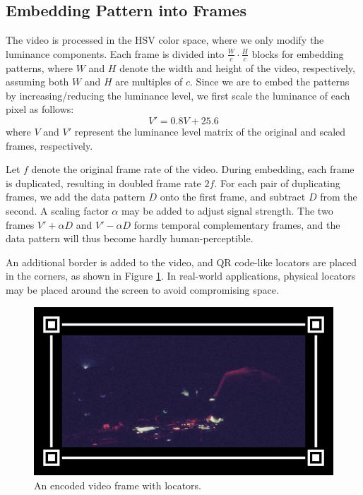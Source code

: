 \documentclass{acm_proc_article-sp}
\begin{document}
\subsection{Embedding Pattern into Frames}
The video is processed in the HSV color space, where we only modify the luminance components. Each frame is divided into $\frac{W}{c}\cdot\frac{H}{c}$ blocks for embedding patterns, where $W$ and $H$ denote the width and height of the video, respectively, assuming both $W$ and $H$ are multiples of $c$. Since we are to embed the patterns by increasing/reducing the luminance level, we first scale the luminance of each pixel as follows:
\begin{equation}
V' = 0.8V + 25.6
\end{equation}
where $V$ and $V'$ represent the luminance level matrix of the original and scaled frames, respectively.

Let $f$ denote the original frame rate of the video. During embedding, each frame is duplicated, resulting in doubled frame rate $2f$. For each pair of duplicating frames, we add the data pattern $D$ onto the first frame, and subtract $D$ from the second. A scaling factor $\alpha$ may be added to adjust signal strength. The two frames $V'+\alpha D$ and $V'-\alpha D$ forms temporal complementary frames, and the data pattern will thus become hardly human-perceptible.

An additional border is added to the video, and QR code-like locators are placed in the corners, as shown in Figure \ref{fig:locator}. In real-world applications, physical locators may be placed around the screen to avoid compromising space.

\begin{figure}
    \centering
    \includegraphics[width=\linewidth]{figures/locator}
    \caption{An encoded video frame with locators.}
    \label{fig:locator}
\end{figure}
\end{document}
